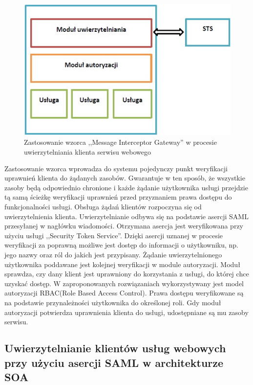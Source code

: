 		\begin{figure}[h]
			\centering
			\includegraphics{img/interceptorGateway.jpg}
			\caption{Zastosowanie wzorca ,,Message Interceptor Gateway'' w procesie uwierzytelniania klienta serwisu webowego}
			\label{Zastosowanie wzorca ,,Message Interceptor Gateway'' w procesie uwierzytelniania klienta serwisu webowego}
		\end{figure}

		Zastosowanie wzorca wprowadza do systemu pojedynczy punkt weryfikacji uprawnień klienta do żądanych zasobów. Gwarantuje w ten sposób, że wszystkie zasoby będą odpowiednio chronione i każde żądanie użytkownika usługi przejdzie tą samą ścieżkę weryfikacji uprawnień przed przyznaniem prawa dostępu do funkcjonalności usługi. Obsługa żądań klientów rozpoczyna się od uwierzytelnienia klienta. Uwierzytelnianie odbywa się na podstawie asercji SAML przesyłanej w nagłówku wiadomości. Otrzymana asercja jest weryfikowana przy użyciu usługi ,,Security Token Service''. Dzięki asercji uznanej w procesie weryfikacji za poprawną możliwe jest dostęp do informacji o użytkowniku, np. jego nazwy oraz ról do jakich jest przypisany. Żądanie uwierzytelnionego użytkownika poddawane jest kolejnej weryfikacji w module autoryzacji. Moduł sprawdza, czy dany klient jest uprawniony do korzystania z usługi, do której chce uzyskać dostęp. W zaproponowanych rozwiązaniach wykorzystywany jest model autoryzacji RBAC(Role Based Access Control). Prawa dostępu weryfikowane są na podstawie przynależności użytkownika do określonej roli. Gdy moduł autoryzacji potwierdza uprawnienia klienta do usługi, udostępniane są mu zasoby serwisu.
	\subsection{Uwierzytelnianie klientów usług webowych przy użyciu asercji SAML w architekturze SOA}

